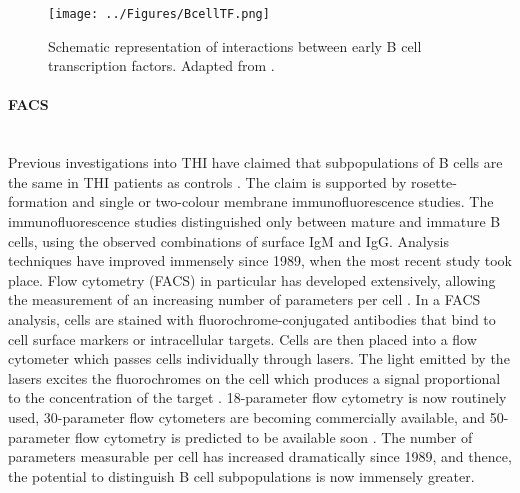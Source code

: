 \documentclass[12pt]{article}
\begin{document}
			
			\begin{figure}
				\centering
				\texttt{[image: ../Figures/BcellTF.png]}
				\caption{Schematic representation of interactions between early B cell transcription factors. Adapted from \citet{Choukrallah14}.}
				\label{fig:TFBcell}
			\end{figure}
			
		\paragraph{FACS}
			~\\
			Previous investigations into THI have claimed that subpopulations of B cells are the same in THI patients as controls \citep{Tiller78,Stiemh80,Siegel81,Buckley83,Fiorilli86,Dressler89}. 
			The claim is supported by rosette-formation and single or two-colour membrane immunofluorescence studies. 
			The immunofluorescence studies distinguished only between mature and immature B cells, using the observed combinations of surface IgM and IgG. 
			Analysis techniques have improved immensely since 1989, when the most recent study took place.
			Flow cytometry (FACS) in particular has developed extensively, allowing the measurement of an increasing number of parameters per cell \citep{Saeys16}.
			In a FACS analysis, cells are stained with fluorochrome-conjugated antibodies that bind to cell surface markers or intracellular targets. 
			Cells are then placed into a flow cytometer which passes cells individually through lasers.
			The light emitted by the lasers excites the fluorochromes on the cell which produces a signal proportional to the concentration of the target \citep{Aghaeepour13}.
			18-parameter flow cytometry is now routinely used, 30-parameter flow cytometers are becoming commercially available, and 50-parameter flow cytometry is predicted to be available soon \citep{Saeys16}.
			The number of parameters measurable per cell has increased dramatically since 1989, and thence, the potential to distinguish B cell subpopulations is now immensely greater.

			
\end{document}
